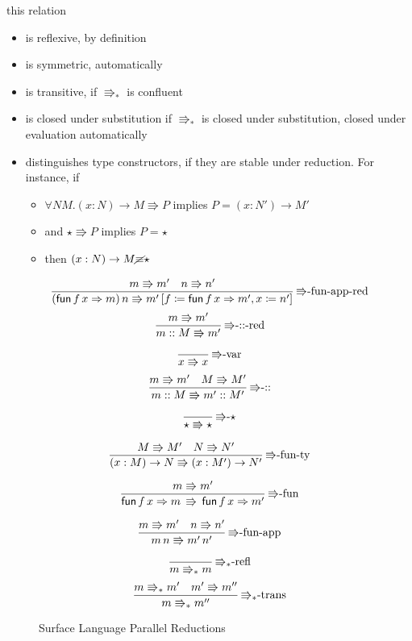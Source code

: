 this relation 
\begin{itemize}
\item is reflexive, by definition
\item is symmetric, automatically
\item is transitive, if $\Rrightarrow_{\ast}$ is confluent
\item is closed under substitution if $\Rrightarrow_{\ast}$ is closed under
substitution, closed under evaluation automatically
\item distinguishes type constructors, if they are stable under reduction.
For instance, if
\begin{itemize}
\item $\forall NM.\left(x:N\right)\rightarrow M\Rrightarrow P$ implies
$P=\left(x:N'\right)\rightarrow M'$
\item and $\star\Rrightarrow P$ implies $P=\star$
\item then $\left(x:N\right)\rightarrow M\cancel{\equiv}\star$
\end{itemize}
\end{itemize}
\begin{figure}
\[
\frac{m\Rrightarrow m'\quad n\Rrightarrow n'}{\left(\mathsf{fun}\,f\,x\Rightarrow m\right)n\Rrightarrow m'\left[f\coloneqq\mathsf{fun}\,f\,x\Rightarrow m',x\coloneqq n'\right]}\,\textrm{\ensuremath{\Rrightarrow}-fun-app-red}
\]
\[
\frac{m\Rrightarrow m'}{m::M\Rrightarrow m'}\,\textrm{\ensuremath{\Rrightarrow}-::-red}
\]

\[
\frac{\,}{x\Rrightarrow x}\,\textrm{\ensuremath{\Rrightarrow}-var}
\]
\[
\frac{m\Rrightarrow m'\quad M\Rrightarrow M'}{m::M\Rrightarrow m'::M'}\,\textrm{\ensuremath{\Rrightarrow}-::}
\]

\[
\frac{\,}{\star\Rrightarrow\star}\,\textrm{\ensuremath{\Rrightarrow}-}\star
\]

\[
\frac{M\Rrightarrow M'\quad N\Rrightarrow N'}{\left(x:M\right)\rightarrow N\Rrightarrow\left(x:M'\right)\rightarrow N'}\,\textrm{\ensuremath{\Rrightarrow}-fun-ty}
\]

\[
\frac{m\Rrightarrow m'}{\mathsf{fun}\,f\,x\Rightarrow m\,\Rrightarrow\,\mathsf{fun}\,f\,x\Rightarrow m'}\,\textrm{\ensuremath{\Rrightarrow}-fun}
\]

\[
\frac{m\Rrightarrow m'\quad n\Rrightarrow n'}{m\,n\Rrightarrow m'\,n'}\,\textrm{\ensuremath{\Rrightarrow}-fun-app}
\]

\[
\frac{\,}{m\Rrightarrow_{\ast}m}\,\textrm{\ensuremath{\Rrightarrow_{\ast}}-refl}
\]
\[
\frac{m\Rrightarrow_{\ast}m'\quad m'\Rrightarrow m''}{m\Rrightarrow_{\ast}m''}\,\textrm{\ensuremath{\Rrightarrow_{\ast}}-trans}
\]

\caption{Surface Language Parallel Reductions}
\label{fig:surface-reduction}
\end{figure}
  
